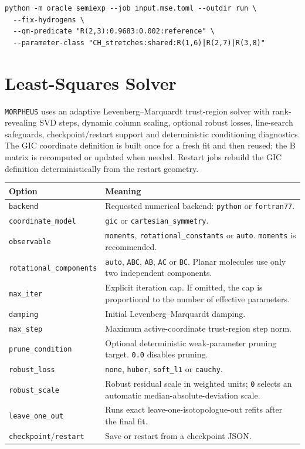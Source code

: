 \documentclass[11pt]{article}
\newcommand{\program}{\texttt{MORPHEUS}}
\begin{document}
\begin{lstlisting}[style=oracle]
python -m oracle semiexp --job input.mse.toml --outdir run \
  --fix-hydrogens \
  --qm-predicate "R(2,3):0.9683:0.002:reference" \
  --parameter-class "CH_stretches:shared:R(1,6)|R(2,7)|R(3,8)"
\end{lstlisting}

\section{Least-Squares Solver}

\program{} uses an adaptive Levenberg--Marquardt trust-region solver with
rank-revealing SVD steps, dynamic column scaling, optional robust losses,
line-search safeguards, checkpoint/restart support and deterministic
conditioning diagnostics.  The GIC coordinate definition is built once for a
fresh fit and then reused; the B matrix is recomputed or updated when needed.
Restart jobs rebuild the GIC definition deterministically from the restart
geometry.

\begin{longtable}{@{}p{0.30\textwidth}p{0.60\textwidth}@{}}
\toprule
Option & Meaning \\
\midrule
\endhead
\texttt{backend} & Requested numerical backend: \texttt{python} or
\texttt{fortran77}. \\
\texttt{coordinate\_model} & \texttt{gic} or
\texttt{cartesian\_symmetry}. \\
\texttt{observable} & \texttt{moments}, \texttt{rotational\_constants} or
\texttt{auto}.  \texttt{moments} is recommended. \\
\texttt{rotational\_components} & \texttt{auto}, \texttt{ABC},
\texttt{AB}, \texttt{AC} or \texttt{BC}.  Planar molecules use only two
independent components. \\
\texttt{max\_iter} & Explicit iteration cap.  If omitted, the cap is
proportional to the number of effective parameters. \\
\texttt{damping} & Initial Levenberg--Marquardt damping. \\
\texttt{max\_step} & Maximum active-coordinate trust-region step norm. \\
\texttt{prune\_condition} & Optional deterministic weak-parameter pruning
target.  \texttt{0.0} disables pruning. \\
\texttt{robust\_loss} & \texttt{none}, \texttt{huber},
\texttt{soft\_l1} or \texttt{cauchy}. \\
\texttt{robust\_scale} & Robust residual scale in weighted units; \texttt{0}
selects an automatic median-absolute-deviation scale. \\
\texttt{leave\_one\_out} & Runs exact leave-one-isotopologue-out refits after
the final fit. \\
\texttt{checkpoint}/\texttt{restart} & Save or restart from a checkpoint JSON.\\
\bottomrule
\end{longtable}
\end{document}
